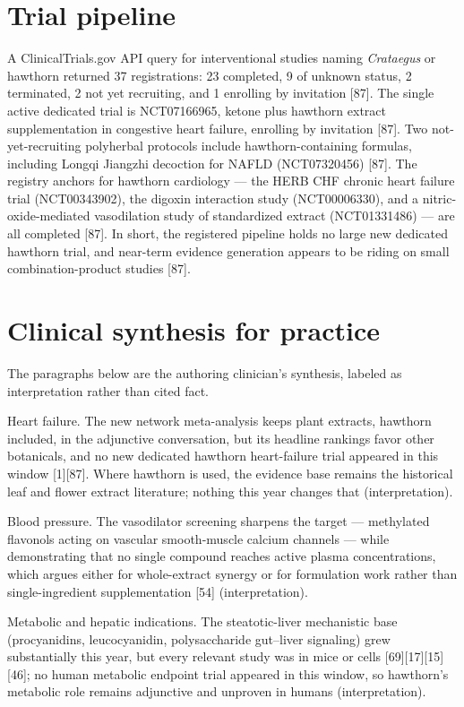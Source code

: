 \documentclass[11pt]{article}
\begin{document}
\section*{Trial pipeline}
A ClinicalTrials.gov API query for interventional studies naming \emph{Crataegus} or hawthorn returned 37 registrations: 23 completed, 9 of unknown status, 2 terminated, 2 not yet recruiting, and 1 enrolling by invitation [87]. The single active dedicated trial is NCT07166965, ketone plus hawthorn extract supplementation in congestive heart failure, enrolling by invitation [87]. Two not-yet-recruiting polyherbal protocols include hawthorn-containing formulas, including Longqi Jiangzhi decoction for NAFLD (NCT07320456) [87]. The registry anchors for hawthorn cardiology --- the HERB CHF chronic heart failure trial (NCT00343902), the digoxin interaction study (NCT00006330), and a nitric-oxide-mediated vasodilation study of standardized extract (NCT01331486) --- are all completed [87]. In short, the registered pipeline holds no large new dedicated hawthorn trial, and near-term evidence generation appears to be riding on small combination-product studies [87].

\section*{Clinical synthesis for practice}
The paragraphs below are the authoring clinician's synthesis, labeled as interpretation rather than cited fact.

Heart failure. The new network meta-analysis keeps plant extracts, hawthorn included, in the adjunctive conversation, but its headline rankings favor other botanicals, and no new dedicated hawthorn heart-failure trial appeared in this window [1][87]. Where hawthorn is used, the evidence base remains the historical leaf and flower extract literature; nothing this year changes that (interpretation).

Blood pressure. The vasodilator screening sharpens the target --- methylated flavonols acting on vascular smooth-muscle calcium channels --- while demonstrating that no single compound reaches active plasma concentrations, which argues either for whole-extract synergy or for formulation work rather than single-ingredient supplementation [54] (interpretation).

Metabolic and hepatic indications. The steatotic-liver mechanistic base (procyanidins, leucocyanidin, polysaccharide gut--liver signaling) grew substantially this year, but every relevant study was in mice or cells [69][17][15][46]; no human metabolic endpoint trial appeared in this window, so hawthorn's metabolic role remains adjunctive and unproven in humans (interpretation).
\end{document}
